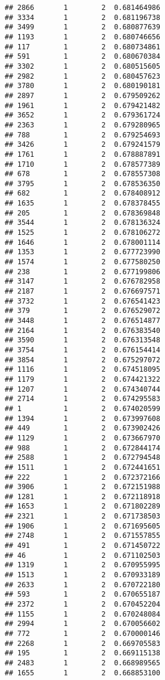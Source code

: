 \documentclass[
]{article}
\begin{document}
\begin{verbatim}
## 2866       1        2  0.681464986
## 3334       1        2  0.681196738
## 3499       1        2  0.680877639
## 1193       1        2  0.680746656
## 117        1        2  0.680734861
## 591        1        2  0.680670384
## 3302       1        2  0.680515605
## 2982       1        2  0.680457623
## 3780       1        2  0.680190181
## 2897       1        2  0.679509262
## 1961       1        2  0.679421482
## 3652       1        2  0.679361724
## 2363       1        2  0.679280965
## 788        1        2  0.679254693
## 3426       1        2  0.679241579
## 1761       1        2  0.678887891
## 1710       1        2  0.678577389
## 678        1        2  0.678557308
## 3795       1        2  0.678536350
## 682        1        2  0.678408912
## 1635       1        2  0.678378455
## 205        1        2  0.678369848
## 3544       1        2  0.678136324
## 1525       1        2  0.678106272
## 1646       1        2  0.678001114
## 1353       1        2  0.677723990
## 1574       1        2  0.677580250
## 238        1        2  0.677199806
## 3147       1        2  0.676782958
## 2187       1        2  0.676697571
## 3732       1        2  0.676541423
## 379        1        2  0.676529072
## 3448       1        2  0.676514877
## 2164       1        2  0.676383540
## 3590       1        2  0.676313548
## 3754       1        2  0.676154414
## 3854       1        2  0.675297072
## 1116       1        2  0.674518095
## 1179       1        2  0.674421322
## 1207       1        2  0.674340744
## 2714       1        2  0.674295583
## 1          1        2  0.674020599
## 1394       1        2  0.673997608
## 449        1        2  0.673902426
## 1129       1        2  0.673667970
## 988        1        2  0.672844174
## 2588       1        2  0.672794548
## 1511       1        2  0.672441651
## 222        1        2  0.672372166
## 3906       1        2  0.672151988
## 1281       1        2  0.672118918
## 1653       1        2  0.671802289
## 2321       1        2  0.671738503
## 1906       1        2  0.671695605
## 2748       1        2  0.671557855
## 491        1        2  0.671450722
## 46         1        2  0.671102503
## 1319       1        2  0.670955995
## 1513       1        2  0.670933189
## 2633       1        2  0.670722180
## 593        1        2  0.670655187
## 2372       1        2  0.670452204
## 1155       1        2  0.670248084
## 2994       1        2  0.670056602
## 772        1        2  0.670000146
## 2268       1        2  0.669705583
## 195        1        2  0.669115138
## 2483       1        2  0.668989565
## 1655       1        2  0.668853100

\end{verbatim}
\end{document}

